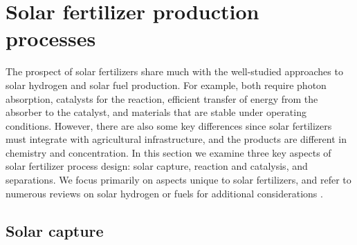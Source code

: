 \section{Solar fertilizer production processes}
\label{sec:approaches}

The prospect of solar fertilizers share much with the well-studied approaches to solar hydrogen and solar fuel production. For example, both require photon absorption, catalysts for the reaction, efficient transfer of energy from the absorber to the catalyst, and materials that are stable under operating conditions. However, there are also some key differences since solar fertilizers must integrate with agricultural infrastructure, and the products are different in chemistry and concentration. In this section we examine three key aspects of solar fertilizer process design: solar capture, reaction and catalysis, and separations. We focus primarily on aspects unique to solar fertilizers, and refer to numerous reviews on solar hydrogen or fuels for additional considerations \cite{McDaniel_2010,Pinaud_2013,Highfield_2015, Shaner_2016, Montoya_2017}. 

\subsection{Solar capture}
\label{sec:solarcapture}

